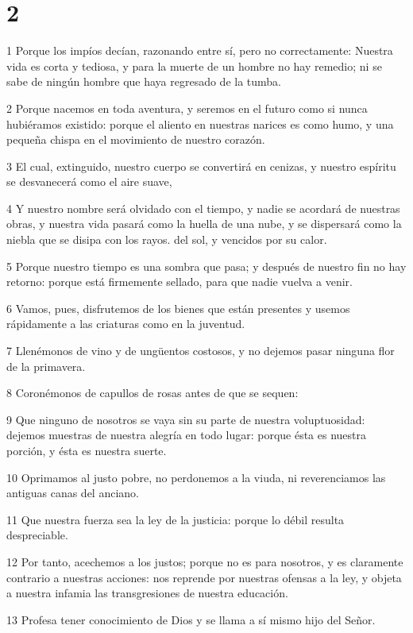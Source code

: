 \chapter{2}

\par 1 Porque los impíos decían, razonando entre sí, pero no correctamente: Nuestra vida es corta y tediosa, y para la muerte de un hombre no hay remedio; ni se sabe de ningún hombre que haya regresado de la tumba.
\par 2 Porque nacemos en toda aventura, y seremos en el futuro como si nunca hubiéramos existido: porque el aliento en nuestras narices es como humo, y una pequeña chispa en el movimiento de nuestro corazón.
\par 3 El cual, extinguido, nuestro cuerpo se convertirá en cenizas, y nuestro espíritu se desvanecerá como el aire suave,
\par 4 Y nuestro nombre será olvidado con el tiempo, y nadie se acordará de nuestras obras, y nuestra vida pasará como la huella de una nube, y se dispersará como la niebla que se disipa con los rayos. del sol, y vencidos por su calor.
\par 5 Porque nuestro tiempo es una sombra que pasa; y después de nuestro fin no hay retorno: porque está firmemente sellado, para que nadie vuelva a venir.
\par 6 Vamos, pues, disfrutemos de los bienes que están presentes y usemos rápidamente a las criaturas como en la juventud.
\par 7 Llenémonos de vino y de ungüentos costosos, y no dejemos pasar ninguna flor de la primavera.
\par 8 Coronémonos de capullos de rosas antes de que se sequen:
\par 9 Que ninguno de nosotros se vaya sin su parte de nuestra voluptuosidad: dejemos muestras de nuestra alegría en todo lugar: porque ésta es nuestra porción, y ésta es nuestra suerte.
\par 10 Oprimamos al justo pobre, no perdonemos a la viuda, ni reverenciamos las antiguas canas del anciano.
\par 11 Que nuestra fuerza sea la ley de la justicia: porque lo débil resulta despreciable.
\par 12 Por tanto, acechemos a los justos; porque no es para nosotros, y es claramente contrario a nuestras acciones: nos reprende por nuestras ofensas a la ley, y objeta a nuestra infamia las transgresiones de nuestra educación.
\par 13 Profesa tener conocimiento de Dios y se llama a sí mismo hijo del Señor.

